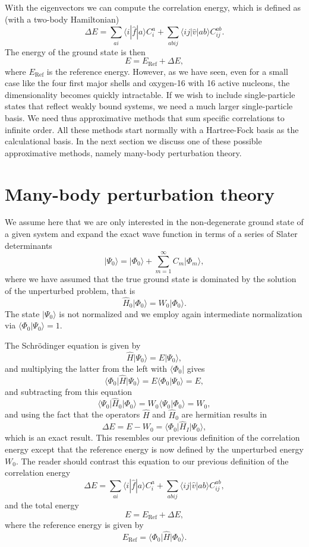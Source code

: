 With the eigenvectors we can compute
  the correlation energy, which is defined as (with a two-body Hamiltonian)
  \[
  \Delta E=\sum_{ai}\langle i| \hat{f}|a \rangle C_{i}^{a}+
  \sum_{abij}\langle ij | \hat{v}| ab \rangle C_{ij}^{ab}.
  \]
The energy of  the ground state is then
  \[
  E=E_{\mathrm{Ref}}+\Delta E,
  \]
where $E_{\mathrm{Ref}}$ is the reference energy.
  However, as we have seen, even for a
  small case like the four first major shells and 
  oxygen-16 with 16 active nucleons, the dimensionality becomes quickly intractable. If we
  wish to include single-particle states that reflect weakly bound
  systems, we need a much larger single-particle basis. We need thus
  approximative methods that sum specific correlations to infinite
  order.  All these methods start normally with a Hartree-Fock basis
  as the calculational basis. In the next section we discuss one of
  these possible approximative methods, namely many-body perturbation
  theory.

  \section{Many-body perturbation theory}\label{sec:mbpt}

  We assume here that we are only interested in the non-degenerate
  ground state of a given system and expand the exact wave function in
  terms of a series of Slater determinants
  \[
  \vert \Psi_0\rangle = \vert \Phi_0\rangle +
  \sum_{m=1}^{\infty}C_m\vert \Phi_m\rangle,
  \]
  where we have assumed that the true ground state is dominated by the
  solution of the unperturbed problem, that is
  \[
  \hat{H}_0\vert \Phi_0\rangle= W_0\vert \Phi_0\rangle.
  \]
  The state $\vert \Psi_0\rangle$ is not normalized and we employ again
  intermediate normalization via $\langle \Phi_0 \vert
  \Psi_0\rangle=1$.

  The Schr\"odinger equation is given by
  \[
  \hat{H}\vert \Psi_0\rangle = E\vert \Psi_0\rangle,
  \]
  and multiplying the latter from the left with $\langle \Phi_0\vert $
  gives
  \[
  \langle \Phi_0\vert \hat{H}\vert \Psi_0\rangle = E\langle
  \Phi_0\vert \Psi_0\rangle=E,
  \]
  and subtracting from this equation
  \[
  \langle \Psi_0\vert \hat{H}_0\vert \Phi_0\rangle= W_0\langle
  \Psi_0\vert \Phi_0\rangle=W_0,
  \]
  and using the fact that the  operators $\hat{H}$ and $\hat{H}_0$
  are hermitian results in
  \begin{equation}\label{eq:mbptcorrel}
  \Delta E=E-W_0=\langle \Phi_0\vert \hat{H}_I\vert \Psi_0\rangle,
  \end{equation}
  which is an exact result. This resembles our previous definition of the correlation energy except that the reference energy is now defined
by the unperturbed energy $W_0$. The reader should contrast this equation to our previous definition of the correlation energy
  \[
  \Delta E=\sum_{ai}\langle i| \hat{f}|a \rangle C_{i}^{a}+
  \sum_{abij}\langle ij | \hat{v}| ab \rangle C_{ij}^{ab},
  \]
and the total energy
  \[
  E=E_{\mathrm{Ref}}+\Delta E,
  \]
where the reference energy is given by
\[   
   E_{\mathrm{Ref}}= \langle \Phi_0 \vert \hat{H} \vert \Phi_0\rangle.
\]


